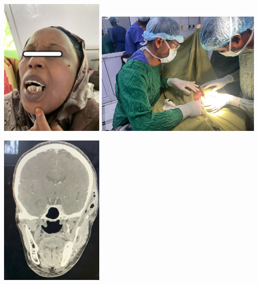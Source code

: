 \documentclass[
paper=landscape,
paper=160mm:90mm, %
fontsize=11pt, %
pagesize, %
parskip=half-, %
]{scrartcl} %
\theoremstyle{mythmstyle} %
\begin{document}
\clearpage
\includegraphics[width=5cm]{IMG_5180_photo_preOP_face.jpg}
\clearpage
\includegraphics[width=8cm]{IMG_5286_localAnesthesia_IandD.JPG}


\clearpage
\includegraphics[width=5cm]{IMG_5296_CT_temporalAbscess.jpg}
\end{document}
